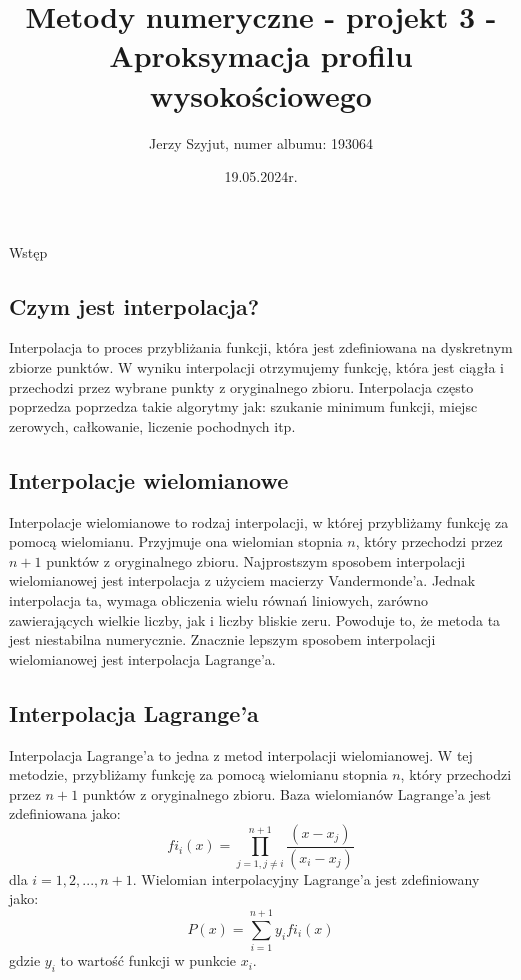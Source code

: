 \documentclass{article}
\title{Metody numeryczne - projekt 3 - Aproksymacja profilu wysokościowego}
\author{Jerzy Szyjut, numer albumu: 193064}
\date{19.05.2024r.}
\begin{document}
\maketitle

\begin{section}{Wstęp}
  \subsection{Czym jest interpolacja?}
  Interpolacja to proces przybliżania funkcji, która jest zdefiniowana na dyskretnym zbiorze punktów. 
  W wyniku interpolacji otrzymujemy funkcję, która jest ciągła i przechodzi przez wybrane punkty z oryginalnego zbioru.
  Interpolacja często poprzedza poprzedza takie algorytmy jak: szukanie minimum funkcji, miejsc zerowych, całkowanie,
  liczenie pochodnych itp.
  \subsection{Interpolacje wielomianowe}\cite{interpolacja_wielomianowa_wiki}
  Interpolacje wielomianowe to rodzaj interpolacji, w której przybliżamy funkcję za pomocą wielomianu.
  Przyjmuje ona wielomian stopnia $n$, który przechodzi przez $n+1$ punktów z oryginalnego zbioru.
  Najprostszym sposobem interpolacji wielomianowej jest interpolacja z użyciem macierzy Vandermonde'a.
  Jednak interpolacja ta, wymaga obliczenia wielu równań liniowych, zarówno zawierających wielkie liczby, jak i
  liczby bliskie zeru. Powoduje to, że metoda ta jest niestabilna numerycznie. Znacznie lepszym sposobem interpolacji
  wielomianowej jest interpolacja Lagrange'a.
  \subsection{Interpolacja Lagrange'a}\cite{wyklad5}
  Interpolacja Lagrange'a to jedna z metod interpolacji wielomianowej. W tej metodzie, przybliżamy funkcję za pomocą
  wielomianu stopnia $n$, który przechodzi przez $n+1$ punktów z oryginalnego zbioru. Baza wielomianów Lagrange'a
  jest zdefiniowana jako:
  \begin{equation}
    fi_{i}(x) = \prod_{j=1, j \neq i}^{n + 1} \frac{(x - x_{j})}{(x_{i} - x_{j})}
  \end{equation}
  dla $i = 1, 2, ..., n + 1$. Wielomian interpolacyjny Lagrange'a jest zdefiniowany jako:
  \begin{equation}
    P(x) = \sum_{i=1}^{n + 1} y_{i}fi_{i}(x)
  \end{equation}
  gdzie $y_{i}$ to wartość funkcji w punkcie $x_{i}$.

\end{section}
\end{document}
